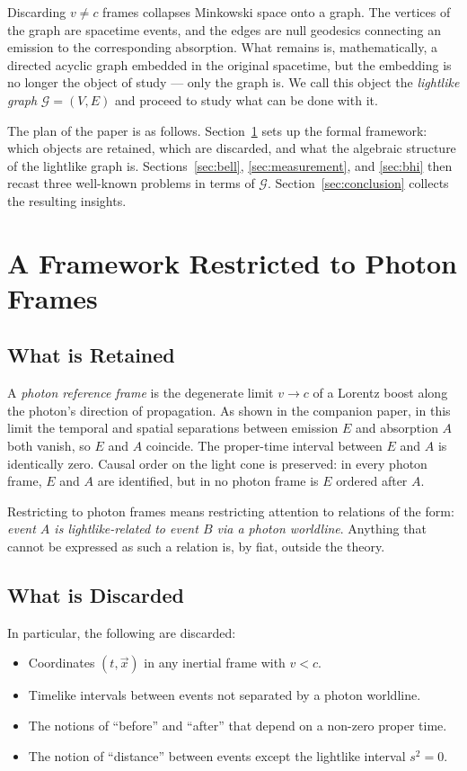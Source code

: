 \documentclass[11pt]{article}
\begin{document}
Discarding $v \neq c$ frames collapses Minkowski space onto a graph. The vertices of the graph are spacetime events, and the edges are null geodesics connecting an emission to the corresponding absorption. What remains is, mathematically, a directed acyclic graph embedded in the original spacetime, but the embedding is no longer the object of study --- only the graph is. We call this object the \emph{lightlike graph} $\mathcal{G} = (V, E)$ and proceed to study what can be done with it.

The plan of the paper is as follows. Section~\ref{sec:framework} sets up the formal framework: which objects are retained, which are discarded, and what the algebraic structure of the lightlike graph is. Sections~\ref{sec:bell}, \ref{sec:measurement}, and \ref{sec:bhi} then recast three well-known problems in terms of $\mathcal{G}$. Section~\ref{sec:conclusion} collects the resulting insights.

\section{A Framework Restricted to Photon Frames}
\label{sec:framework}

\subsection{What is Retained}

A \emph{photon reference frame} is the degenerate limit $v \to c$ of a Lorentz boost along the photon's direction of propagation. As shown in the companion paper, in this limit the temporal and spatial separations between emission $E$ and absorption $A$ both vanish, so $E$ and $A$ coincide. The proper-time interval between $E$ and $A$ is identically zero. Causal order on the light cone is preserved: in every photon frame, $E$ and $A$ are identified, but in no photon frame is $E$ ordered after $A$.

Restricting to photon frames means restricting attention to relations of the form: \emph{event $A$ is lightlike-related to event $B$ via a photon worldline}. Anything that cannot be expressed as such a relation is, by fiat, outside the theory.

\subsection{What is Discarded}

In particular, the following are discarded:
\begin{itemize}
    \item Coordinates $(t, \vec{x})$ in any inertial frame with $v < c$.
    \item Timelike intervals between events not separated by a photon worldline.
    \item The notions of ``before'' and ``after'' that depend on a non-zero proper time.
    \item The notion of ``distance'' between events except the lightlike interval $s^2 = 0$.
\end{itemize}
\end{document}
